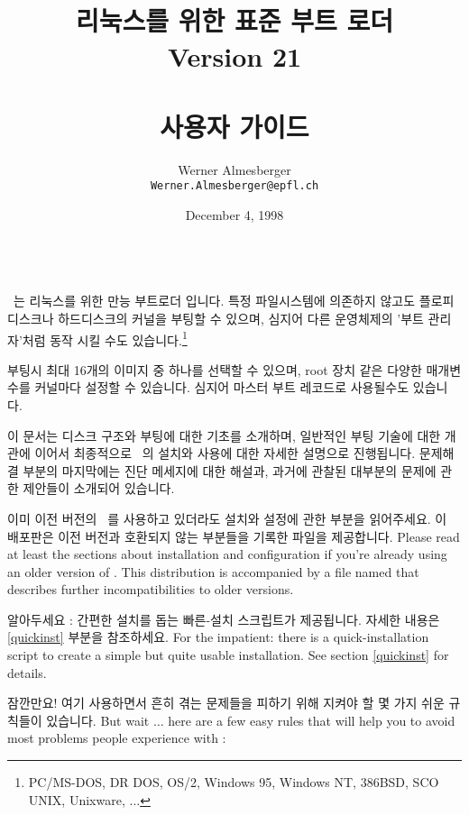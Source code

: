 \title{\LILO \\
  \Large
  리눅스를 위한 표준 부트 로더 \\
  Version 21 \\ ~\\
  \bf 사용자 가이드}
\author{Werner Almesberger \\
  {\tt Werner.Almesberger@epfl.ch}}
\date{December 4, 1998}

\maketitle
{
  \parskip=-1pt
  \setcounter{tocdepth}{2}
  \tableofcontents
}

~\\
\LILO\ 는 리눅스를 위한 만능 부트로더 입니다. 특정 파일시스템에 의존하지 않고도 플로피 디스크나 하드디스크의 커널을 부팅할 수 있으며, 심지어 다른 운영체제의 '부트 관리자'처럼 동작 시킬 수도 있습니다.\footnote{PC/MS-DOS, DR DOS, OS/2, Windows 95, Windows NT, 386BSD, SCO UNIX, Unixware, $\ldots$}

부팅시 최대 16개의 이미지 중 하나를 선택할 수 있으며, 
root 장치 같은 다양한 매개변수를 커널마다 설정할 수 있습니다.
\LILO\는 심지어 마스터 부트 레코드로 사용될수도 있습니다.

이 문서는 디스크 구조와 부팅에 대한 기초를 소개하며,
일반적인 부팅 기술에 대한 개관에 이어서 최종적으로 \LILO\ 의 설치와 사용에 대한 자세한 설명으로 진행됩니다. 문제해결 부분의 마지막에는 진단 메세지에 대한 해설과, 과거에 관찰된 대부분의 문제에 관한 제안들이 소개되어 있습니다.

이미 이전 버전의 \LILO\ 를 사용하고 있더라도 설치와 설정에 관한 부분을 읽어주세요.
이 배포판은 이전 버전과 호환되지 않는 부분들을 기록한  파일을 제공합니다. 
Please read at least the sections about installation and configuration if
you're already using an older version of \LILO. This distribution is
accompanied by a file named  that describes further
incompatibilities to older versions.

알아두세요 : 간편한 설치를 돕는 빠른-설치 스크립트가 제공됩니다. 자세한 내용은 \ref{quickinst} 부분을 참조하세요.
For the impatient: there is a quick-installation script to create
a simple but quite usable installation. See section \ref{quickinst} for
details.

잠깐만요! 여기 \LILO\를 사용하면서 흔히 겪는 문제들을 피하기 위해 지켜야 할 몇 가지 쉬운 규칙들이 있습니다.
But wait $\ldots$ here are a few easy rules that will help you to avoid
most problems people experience with \LILO:

